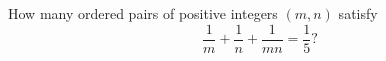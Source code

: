 How many ordered pairs of positive integers $(m,n)$ satisfy
\[
\dfrac{1}{m}+\dfrac{1}{n}+\dfrac{1}{mn}=\dfrac{1}{5} ?
\]
